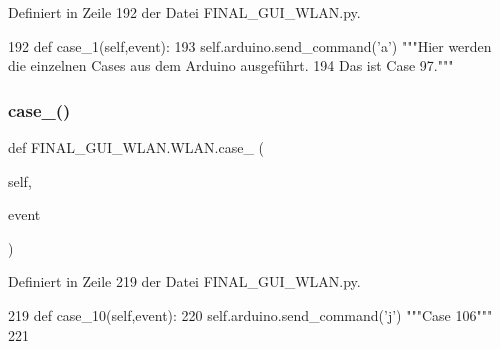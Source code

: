 Definiert in Zeile 192 der Datei F\+I\+N\+A\+L\+\_\+\+G\+U\+I\+\_\+\+W\+L\+A\+N.\+py.


\begin{DoxyCode}
192     \textcolor{keyword}{def }case\_1(self,event):
193         self.arduino.send\_command(\textcolor{stringliteral}{'a'})  \textcolor{stringliteral}{"""Hier werden die einzelnen Cases aus dem Arduino ausgeführt.}
194 \textcolor{stringliteral}{                                           Das ist Case 97."""}
\end{DoxyCode}
\mbox{\label{class_f_i_n_a_l___g_u_i___w_l_a_n_1_1_w_l_a_n_ad9a73c955c581f35964a55f79b9891ec}} 
\subsubsection{\texorpdfstring{case\+\_()}{case\_10()}}
{\footnotesize\ttfamily def F\+I\+N\+A\+L\+\_\+\+G\+U\+I\+\_\+\+W\+L\+A\+N.\+W\+L\+A\+N.\+case\+\_ (\begin{DoxyParamCaption}\item[{}]{self,  }\item[{}]{event }\end{DoxyParamCaption})}



Definiert in Zeile 219 der Datei F\+I\+N\+A\+L\+\_\+\+G\+U\+I\+\_\+\+W\+L\+A\+N.\+py.


\begin{DoxyCode}
219     \textcolor{keyword}{def }case\_10(self,event):
220         self.arduino.send\_command(\textcolor{stringliteral}{'j'})  \textcolor{stringliteral}{"""Case 106"""}
221     
\end{DoxyCode}
\mbox{\label{class_f_i_n_a_l___g_u_i___w_l_a_n_1_1_w_l_a_n_ae350f0f04417a03ebbde210d60553283}} 
